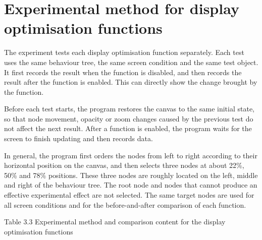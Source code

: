 \section{Experimental method for display optimisation functions}

The experiment tests each display optimisation function separately. Each test uses the same behaviour tree, the same screen condition and the same test object. It first records the result when the function is disabled, and then records the result after the function is enabled. This can directly show the change brought by the function.

Before each test starts, the program restores the canvas to the same initial state, so that node movement, opacity or zoom changes caused by the previous test do not affect the next result. After a function is enabled, the program waits for the screen to finish updating and then records data.

In general, the program first orders the nodes from left to right according to their horizontal position on the canvas, and then selects three nodes at about 22\%, 50\% and 78\% positions. These three nodes are roughly located on the left, middle and right of the behaviour tree. The root node and nodes that cannot produce an effective experimental effect are not selected. The same target nodes are used for all screen conditions and for the before-and-after comparison of each function.

Table 3.3 Experimental method and comparison content for the display optimisation functions


